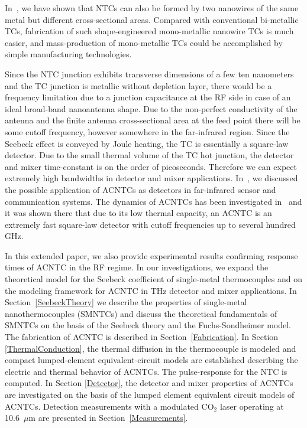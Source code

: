 \documentclass[journal]{IEEEtran}
\begin{document}
In~\cite{szakmany_single-metal_2014}, we have shown that NTCs can also be formed by two nanowires of the same metal but different cross-sectional areas. Compared with conventional bi-metallic TCs, fabrication of such shape-engineered mono-metallic nanowire {TCs} is much easier, and mass-production of mono-metallic TCs could be accomplished by simple manufacturing technologies.

Since the NTC junction exhibits transverse dimensions of a few ten nanometers and the TC junction is metallic without depletion layer, there would be a frequency limitation due to a junction capacitance at the RF side in case of an ideal broad-band nanoantenna shape. Due to the non-perfect conductivity of the antenna and the finite antenna cross-sectional area at the feed point there will be some cutoff frequency, however somewhere in the far-infrared region. Since the Seebeck effect is conveyed by Joule heating, the TC is essentially a square-law detector. Due to the small thermal volume of the TC hot junction, the detector and mixer  time-constant is on the order of picoseconds. Therefore we can expect extremely high bandwidths in detector and mixer applications. In~\cite{szakmany_nano-antenna_2014}, we discussed the possible application of ACNTCs as detectors in far-infrared sensor  and communication systems. The dynamics of ACNTCs has been investigated in~\cite{russer_dynamics_2014,russer_nanostructured_2015,russer_antenna-coupled_2015} and it was shown there that due to its low thermal capacity, an ACNTC is an extremely fast square-law detector with cutoff frequencies up to several hundred GHz.

In this extended paper, we also provide experimental results confirming response times of ACNTC in the RF regime. In our investigations, we expand the theoretical model for the Seebeck coefficient of single-metal thermocouples and on the modeling framework for ACNTC in THz detector and mixer applications.
In Section~\ref{SeebeckTheory} we describe the properties of single-metal nanothermocouples (SMNTCs) and discuss the theoretical fundamentals of SMNTCs on the basis of the Seebeck theory and the Fuchs-Sondheimer model.  The fabrication of ACNTC is described in Section~\ref{Fabrication}. In Section \ref{ThermalConduction}, the thermal diffusion in the thermocouple is modeled and compact lumped-element equivalent-circuit models are established describing the electric and thermal behavior of ACNTCs. The pulse-response for the NTC is computed.  In Section \ref{Detector}, the detector and mixer properties of ACNTCs are investigated on the basis of the lumped element equivalent circuit models of ACNTCs.  Detection measurements with a modulated CO$_2$ laser operating at 10.6~$\mu$m are presented in Section~\ref{Measurements}.
%
%
\end{document}
